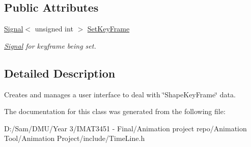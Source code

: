 \subsection*{Public Attributes}
\begin{DoxyCompactItemize}
\item 
\mbox{\label{class_time_line_a250b77331838512edd9656bf12169e9d}} 
\hyperlink{class_signal}{Signal}$<$ unsigned int $>$ \hyperlink{class_time_line_a250b77331838512edd9656bf12169e9d}{Set\+Key\+Frame}
\begin{DoxyCompactList}\small\item\em \hyperlink{class_signal}{Signal} for keyframe being set. \end{DoxyCompactList}\end{DoxyCompactItemize}


\subsection{Detailed Description}
Creates and manages a user interface to deal with \char`\"{}\+Shape\+Key\+Frame\char`\"{} data. 

The documentation for this class was generated from the following file\+:\begin{DoxyCompactItemize}
\item 
D\+:/\+Sam/\+D\+M\+U/\+Year 3/\+I\+M\+A\+T3451 -\/ Final/\+Animation project repo/\+Animation Tool/\+Animation Project/include/Time\+Line.\+h\end{DoxyCompactItemize}
